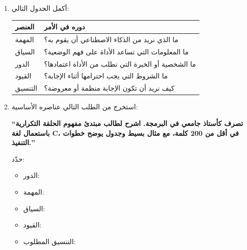 \documentclass[a4paper]{article}
\begin{document}
\begin{enumerate}
\begin{center}
\end{center}

هل أصبحت الإجابة أكثر تنظيمًا؟ علّل.


\item أكمل الجدول التالي:

\begin{center}

\begin{tabular}{|
>{\raggedleft\arraybackslash}m{4cm}|
>{\raggedleft\arraybackslash}m{10cm}|}

\hline

\textbf{العنصر} & \textbf{دوره في الأمر} \\

\hline

المهمة
&
ما الذي نريد من الذكاء الاصطناعي أن يقوم به؟
\\
\hline

السياق
&
ما المعلومات التي تساعد الأداة على فهم الوضعية؟
\\
\hline

الدور
&
ما الشخصية أو الخبرة التي نطلب من الأداة اعتمادها؟
\\
\hline

القيود
&
ما الشروط التي يجب احترامها أثناء الإجابة؟
\\
\hline

التنسيق
&
كيف نريد أن تكون الإجابة منظمة أو معروضة؟
\\
\hline

\end{tabular}

\end{center}


\item استخرج من الطلب التالي عناصره الأساسية:

\begin{center}

\textbf{
``تصرف كأستاذ جامعي في البرمجة.
اشرح لطالب مبتدئ مفهوم الحلقة التكرارية
باستعمال لغة C، في أقل من 200 كلمة،
مع مثال بسيط وجدول يوضح خطوات التنفيذ.''
}

\end{center}

حدّد:

\begin{itemize}

    \item الدور:
    \item المهمة:
    \item السياق:
    \item القيود:
    \item التنسيق المطلوب:

\end{itemize}

\end{enumerate}
\end{document}
